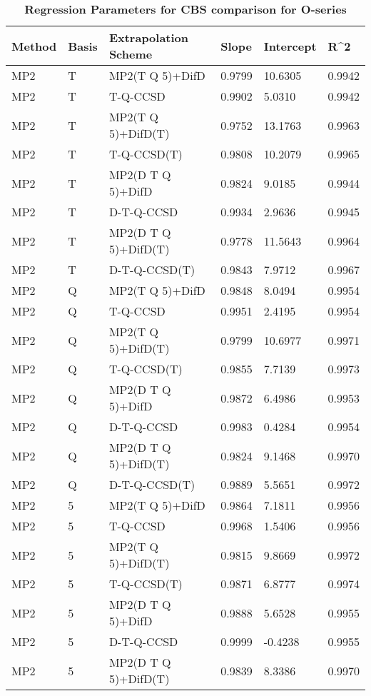 \begin{table}
  \caption{\textbf{Regression Parameters for CBS comparison for O-series}}
  \label{tbl:regression-two-o}
  \begin{tabular}{l l l l l l }
    \hline
    Method & Basis & Extrapolation Scheme & Slope & Intercept & R^2 \\ 
    \hline
    MP2 & T & MP2(T Q 5)+DifD & 0.9799 & 10.6305 & 0.9942 \\ 
    MP2 & T & T-Q-CCSD & 0.9902 & 5.0310 & 0.9942 \\ 
    MP2 & T & MP2(T Q 5)+DifD(T) & 0.9752 & 13.1763 & 0.9963 \\ 
    MP2 & T & T-Q-CCSD(T) & 0.9808 & 10.2079 & 0.9965 \\ 
    MP2 & T & MP2(D T Q 5)+DifD & 0.9824 & 9.0185 & 0.9944 \\ 
    MP2 & T & D-T-Q-CCSD & 0.9934 & 2.9636 & 0.9945 \\ 
    MP2 & T & MP2(D T Q 5)+DifD(T) & 0.9778 & 11.5643 & 0.9964 \\ 
    MP2 & T & D-T-Q-CCSD(T) & 0.9843 & 7.9712 & 0.9967 \\ 
    MP2 & Q & MP2(T Q 5)+DifD & 0.9848 & 8.0494 & 0.9954 \\ 
    MP2 & Q & T-Q-CCSD & 0.9951 & 2.4195 & 0.9954 \\ 
    MP2 & Q & MP2(T Q 5)+DifD(T) & 0.9799 & 10.6977 & 0.9971 \\ 
    MP2 & Q & T-Q-CCSD(T) & 0.9855 & 7.7139 & 0.9973 \\ 
    MP2 & Q & MP2(D T Q 5)+DifD & 0.9872 & 6.4986 & 0.9953 \\ 
    MP2 & Q & D-T-Q-CCSD & 0.9983 & 0.4284 & 0.9954 \\ 
    MP2 & Q & MP2(D T Q 5)+DifD(T) & 0.9824 & 9.1468 & 0.9970 \\ 
    MP2 & Q & D-T-Q-CCSD(T) & 0.9889 & 5.5651 & 0.9972 \\ 
    MP2 & 5 & MP2(T Q 5)+DifD & 0.9864 & 7.1811 & 0.9956 \\ 
    MP2 & 5 & T-Q-CCSD & 0.9968 & 1.5406 & 0.9956 \\ 
    MP2 & 5 & MP2(T Q 5)+DifD(T) & 0.9815 & 9.8669 & 0.9972 \\ 
    MP2 & 5 & T-Q-CCSD(T) & 0.9871 & 6.8777 & 0.9974 \\ 
    MP2 & 5 & MP2(D T Q 5)+DifD & 0.9888 & 5.6528 & 0.9955 \\ 
    MP2 & 5 & D-T-Q-CCSD & 0.9999 & -0.4238 & 0.9955 \\ 
    MP2 & 5 & MP2(D T Q 5)+DifD(T) & 0.9839 & 8.3386 & 0.9970 \\ 

\end{tabular}
\end{table}
